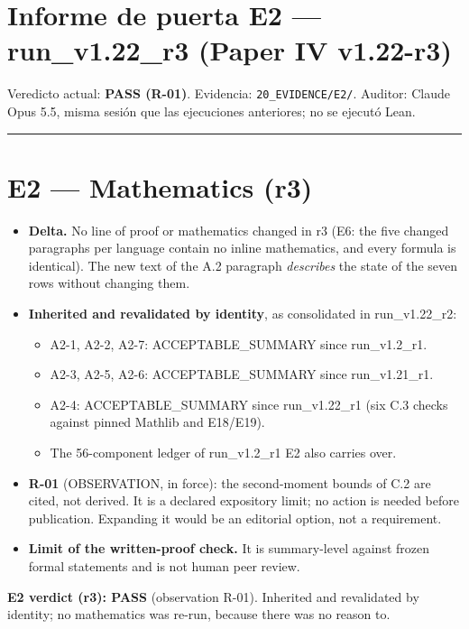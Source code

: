 \documentclass[
]{article}
\author{}
\date{}
\providecommand{\tightlist}{%
  \setlength{\itemsep}{0pt}\setlength{\parskip}{0pt}}
\begin{document}
\section{Informe de puerta E2 --- run\_v1.22\_r3 (Paper IV
v1.22-r3)}\label{informe-de-puerta-e2--run_v122_r3-paper-iv-v122-r3}

Veredicto actual: \textbf{PASS (R-01)}. Evidencia:
\texttt{20\_EVIDENCE/E2/}. Auditor: Claude Opus 5.5, misma sesión que
las ejecuciones anteriores; no se ejecutó Lean.

\begin{center}\rule{0.5\linewidth}{0.5pt}\end{center}

\section{E2 --- Mathematics (r3)}\label{e2--mathematics-r3}

\begin{itemize}
\tightlist
\item
  \textbf{Delta.} No line of proof or mathematics changed in r3 (E6: the
  five changed paragraphs per language contain no inline mathematics,
  and every formula is identical). The new text of the A.2 paragraph
  \emph{describes} the state of the seven rows without changing them.
\item
  \textbf{Inherited and revalidated by identity}, as consolidated in
  run\_v1.22\_r2:

  \begin{itemize}
  \tightlist
  \item
    A2-1, A2-2, A2-7: ACCEPTABLE\_SUMMARY since run\_v1.2\_r1.
  \item
    A2-3, A2-5, A2-6: ACCEPTABLE\_SUMMARY since run\_v1.21\_r1.
  \item
    A2-4: ACCEPTABLE\_SUMMARY since run\_v1.22\_r1 (six C.3 checks
    against pinned Mathlib and E18/E19).
  \item
    The 56-component ledger of run\_v1.2\_r1 E2 also carries over.
  \end{itemize}
\item
  \textbf{R-01} (OBSERVATION, in force): the second-moment bounds of C.2
  are cited, not derived. It is a declared expository limit; no action
  is needed before publication. Expanding it would be an editorial
  option, not a requirement.
\item
  \textbf{Limit of the written-proof check.} It is summary-level against
  frozen formal statements and is not human peer review.
\end{itemize}

\textbf{E2 verdict (r3): PASS} (observation R-01). Inherited and
revalidated by identity; no mathematics was re-run, because there was no
reason to.
\end{document}
